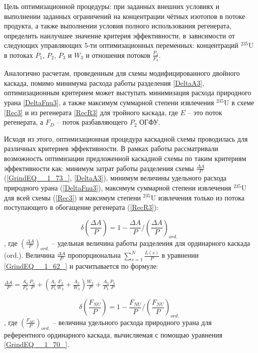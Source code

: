 Цель оптимизационной процедуры: при заданных внешних условиях и выполнении заданных ограничений на концентрации чётных изотопов в потоке продукта, а также выполнении условия полного использования регенерата, определить наилучшее значение критерия эффективности, в зависимости от следующих управляющих 5-ти оптимизационных переменных: концентраций $^{235}$U в потоках $P_1$, $P_2$, $P_3$ и $W_3$ и отношения потоков $\frac{P_{2}}{F_3}$.

Аналогично расчетам, проведенным для схемы модифицированного двойного каскада, помимо минимума расхода работы разделения \ref{DeltaA3}, оптимизационным критерием может выступать минимизация расхода природного урана \ref{DeltaFnu3}, а также максимум суммарной степени извлечения $^{235}$U в схеме \ref{Rec3} и из регенерата \ref{RecR3} для тройного каскада, где $E$ -- это поток регенерата, а $F_D$ -- поток разбавляющего $P_2$ ОГФУ.

Исходя из этого, оптимизационная процедура каскадной схемы проводилась для различных критериев эффективности. В рамках работы рассматривали возможность оптимизации предложенной каскадной схемы по таким критериям эффективности как: минимум затрат работы разделения схемы $\frac{\Delta A}{P}$ (\ref{GrindEQ__1_73_}, \ref{DeltaA3}), минимум величины удельного расхода природного урана (\ref{DeltaFnu3}), максимум суммарной степени извлечения $^{235}$U для всей схемы (\ref{Rec3}) и максимум степени $^{235}$U извлечения только из потока поступающего в обогащение регенерата (\ref{RecR3}):

\begin{equation} \label{DeltaA3} 
    \delta(\frac{\Delta A}{P})=1-\frac{\Delta A}{P}/(\frac{\Delta A}{P})_{ord.}
\end{equation}
, где $(\frac{\Delta A}{P})_{ord.}$ -- удельная величина работы разделения для ординарного каскада (ord.). Величина $\frac{\Delta A}{P}$ пропорциональна $\sum _{s=1}^{N}\frac{L(s)}{P}$ в уравнении \ref{GrindEQ__1_62_} и расчитывается по формуле:

$\frac{\Delta A}{P} = \frac{A_n}{P_n} \frac{P_n}{P}+(\frac{A_1}{P_1} \frac{F_2}{W_2}+\frac{A_2}{W_2}) \frac{W_2}{P} + \frac{A_3}{P_3} \frac{P_3}{P}$

\begin{equation} \label{DeltaFnu3} 
\delta(\frac{F_{NU}}{P})=1-\frac{F_{NU}}{P}/(\frac{F_{NU}}{P})_{ord.}
\end{equation} 
, где $(\frac{F_{NU}}{P})_{ord.}$ -- величина удельного расхода природного урана для референтного ординарного каскада, вычисляемая с помощью уравнения \ref{GrindEQ__1_70_}.

